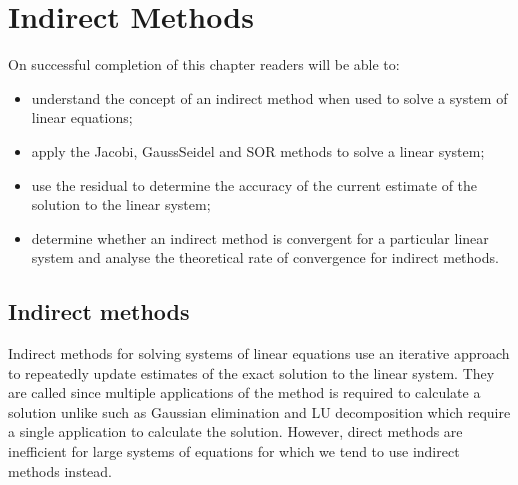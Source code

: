 \documentclass[letterpaper,10pt,english]{jupyterBook}
\begin{document}
\sphinxstepscope


\chapter{Indirect Methods}
\label{\detokenize{7_Indirect_methods/7.0_Indirect_methods:indirect-methods}}\label{\detokenize{7_Indirect_methods/7.0_Indirect_methods:indirect-methods-chapter}}\label{\detokenize{7_Indirect_methods/7.0_Indirect_methods::doc}}
\sphinxAtStartPar
{}

\sphinxAtStartPar
On successful completion of this chapter readers will be able to:
\begin{itemize}
\item {} 
\sphinxAtStartPar
understand the concept of an indirect method when used to solve a system of linear equations;

\item {} 
\sphinxAtStartPar
apply the Jacobi, Gauss\sphinxhyphen{}Seidel and SOR methods to solve a linear system;

\item {} 
\sphinxAtStartPar
use the residual to determine the accuracy of the current estimate of the solution to the linear system;

\item {} 
\sphinxAtStartPar
determine whether an indirect method is convergent for a particular linear system and analyse the theoretical rate of convergence for indirect methods.

\end{itemize}


\section{Indirect methods}
\label{\detokenize{7_Indirect_methods/7.0_Indirect_methods:id1}}
\sphinxAtStartPar
Indirect methods for solving systems of linear equations use an iterative approach to repeatedly update estimates of the exact solution to the linear system. They are called  since multiple applications of the method is required to calculate a solution unlike {\hyperref[\detokenize{6_Direct_methods/6.0_Direct_methods:direct-methods-chapter}]{}} such as Gaussian elimination and LU decomposition which require a single application to calculate the solution. However, direct methods are inefficient for large systems of equations for which we tend to use indirect methods instead.
\end{document}
